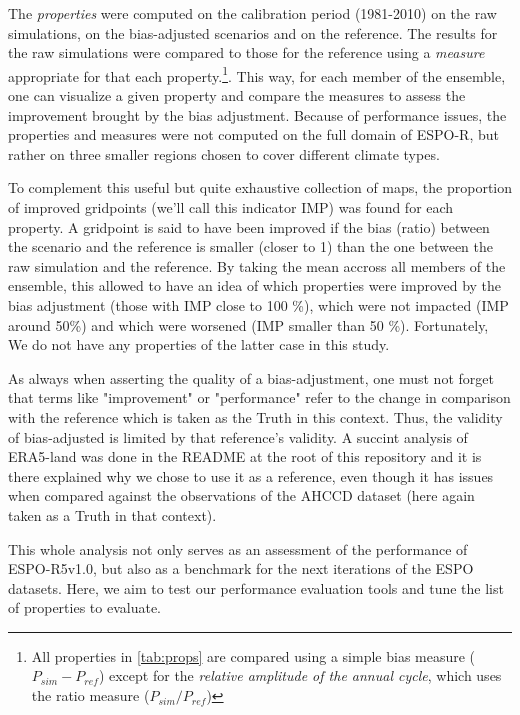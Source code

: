 \documentclass[letterpaper,10pt]{article}
\begin{document}
The \emph{properties} were computed on the calibration period (1981-2010) on the raw simulations, on the bias-adjusted scenarios and on the reference. The results for the raw simulations were compared to those for the reference using a \emph{measure} appropriate for that each property.\footnote{All properties in \ref{tab:props} are compared using a simple bias measure ($P_{sim} - P_{ref}$) except for the \emph{relative amplitude of the annual cycle}, which uses the ratio measure ($P_{sim} / P_{ref}$)}. This way, for each member of the ensemble, one can visualize a given property and compare the measures to assess the improvement brought by the bias adjustment. Because of performance issues, the properties and measures were not computed on the full domain of ESPO-R, but rather on three smaller regions chosen to cover different climate types.

To complement this useful but quite exhaustive collection of maps, the proportion of improved gridpoints (we'll call this indicator IMP) was found for each property. A gridpoint is said to have been improved if the bias (ratio) between the scenario and the reference is smaller (closer to 1) than the one between the raw simulation and the reference. By taking the mean accross all members of the ensemble, this allowed to have an idea of which properties were improved by the bias adjustment (those with IMP close to 100 \%), which were not impacted (IMP around 50\%) and which were worsened (IMP smaller than 50 \%). Fortunately, We do not have any properties of the latter case in this study.

As always when asserting the quality of a bias-adjustment, one must not forget that terms like "improvement" or "performance" refer to the change in comparison with the reference which is taken as the Truth in this context. Thus, the validity of bias-adjusted is limited by that reference's validity. A succint analysis of ERA5-land was done in the README at the root of this repository and it is there explained why we chose to use it as a reference, even though it has issues when compared against the observations of the AHCCD dataset (here again taken as a Truth in that context).

This whole analysis not only serves as an assessment of the performance of ESPO-R5v1.0, but also as a benchmark for the next iterations of the ESPO datasets. Here, we aim to test our performance evaluation tools and tune the list of properties to evaluate.
\end{document}
